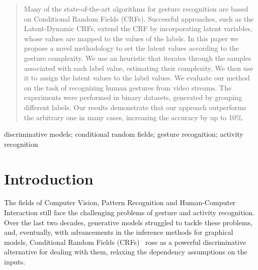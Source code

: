 \documentclass[10pt, conference]{IEEEtran}
\begin{document}
\begin{abstract}
Many of the state-of-the-art algorithms for gesture recognition are based on Conditional Random Fields (CRFs). 
Successful approaches, such as the Latent-Dynamic CRFs, extend the CRF by incorporating latent variables, whose values are mapped to the values of the labels.
In this paper we propose a novel methodology to set the latent values according to the gesture complexity.
We use an heuristic that iterates through the samples associated with each label value, estimating their complexity. We then use it to assign the latent values to the label values.
We evaluate our method on the task of recognizing human gestures from video streams. 
The experiments were performed in binary datasets, generated by grouping different labels.
Our results demonstrate that our approach outperforms the arbitrary one in many cases, increasing the accuracy by up to 10\%.
\end{abstract}
\begin{IEEEkeywords}
discriminative models;
conditional random fields; 
gesture recognition; 
activity recognition
\end{IEEEkeywords}

\IEEEpeerreviewmaketitle

\section{Introduction}
\label{it}
The fields of Computer Vision, Pattern Recognition and Human-Computer Interaction still face the challenging problems of gesture and activity recognition.  
Over the last two decades, generative models struggled to tackle these problems, and, eventually, with advancements in the inference methods for graphical models, Conditional Random Fields (CRFs)~\cite{crf} rose as a powerful discriminative alternative for dealing with them, relaxing the dependency assumptions on the inputs.
\end{document}
